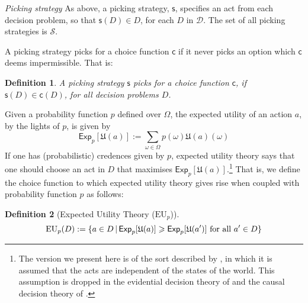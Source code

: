 \documentclass[a4paper]{article}
\newtheorem{definition}{Definition}
\newcommand\A{\mathcal{A}}
\newcommand\D{\mathcal{D}}
\renewcommand\S{\mathcal{S}}
\newcommand\s{\mathsf{s}}
\renewcommand\c{\mathsf{c}} %
\newcommand\Exp{\mathsf{Exp}}
\newcommand\EU{\mathrm{EU}}
\newcommand\U{\mathfrak{U}} %
\newcommand{\todoinfo}[2][]{\todo[backgroundcolor=orange!80,bordercolor=black,linecolor=gray!80, #1,inline,caption={}]{#2}}
\newcommand\SetDelimiter[1][]{
	\nonscript\,#1\vert \allowbreak \nonscript\,\mathopen{}}
\providecommand\given{\SetDelimiter}
\renewcommand{\emptyset}{\varnothing}
\renewcommand{\geq}{\geqslant}
\newenvironment{CCM rewritten}
{\begingroup\color{blue}} %
{\endgroup}              %
\begin{document}









\emph{Picking strategy } As above, a picking strategy, $\s$, specifies an act from each decision problem, so that $\s(D)\in D$, for each $D$ in $\D$. The set of all picking strategies is $\S$. 

A picking strategy picks for a choice function $\c$ if it never picks an option which $\c$ deems impermissible. That is: 
\begin{definition}
	A picking strategy $\s$ \emph{picks for a choice function} $\c$, if $\s(D) \in \c(D)$, for all decision problems $D$.
\end{definition}


Given a probability function $p$ defined over $\Omega$, the expected utility of an action $a$, by the lights of $p$, is given by \begin{equation}
	\Exp_p [\U(a)]:=\sum_{\omega\in\Omega}p(\omega)\U(a)(\omega)
\end{equation}
If one has (probabilistic) credences given by $p$, expected utility theory says that one should choose an act in $D$ that maximises $\Exp_p[\U(a)]$.\footnote{The version we present here is of the sort described by \citet{savage1954fs}, in which it is assumed that the acts are independent of the states of the world. This assumption is dropped in the evidential decision theory of \citet{jeffrey1965lod} and the causal decision theory of \citet{stalnaker1972ldl, gibbard1978ctk, joyce1999fcdt}.} That is, we define the choice function to which expected utility theory gives rise when coupled with probability function $p$ as follows:

\begin{definition}[Expected Utility Theory ($\EU_p$)]
	\[\EU_p(D):=\{a\in D\given \Exp_p[\U(a)]\geq \Exp_p[\U(a')]\text{ for all $a'\in D$}\}\]
\end{definition}
\end{document}
